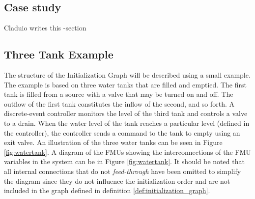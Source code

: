 \documentclass[runningheads]{llncs}
\begin{document}
\subsection{Case study}
Claduio writes this -section 
\subsection{Three Tank Example}
The structure of the Initialization Graph will be described using a small example. 
The example is based on three water tanks that are filled and emptied. The first tank is filled from a source with a valve that may be turned on and off. The outflow of the first tank constitutes the inflow of the second, and so forth. A discrete-event controller monitors the level of the third tank and controls a valve to a drain. When the water level of the tank reaches a particular level (defined in the controller), the controller sends a command to the tank to empty using an exit valve. An illustration of the three water tanks can be seen in Figure \ref{fig:watertank}. A diagram of the FMUs showing the interconnections of the FMU variables in the system can be in Figure \ref{fig:watertank}. It should be noted that all internal connections that do not \textit{feed-through} have been omitted to simplify the diagram since they do not influence the initialization order and are not included in the graph defined in definition \ref{def:initialization_graph}. 
\end{document}
